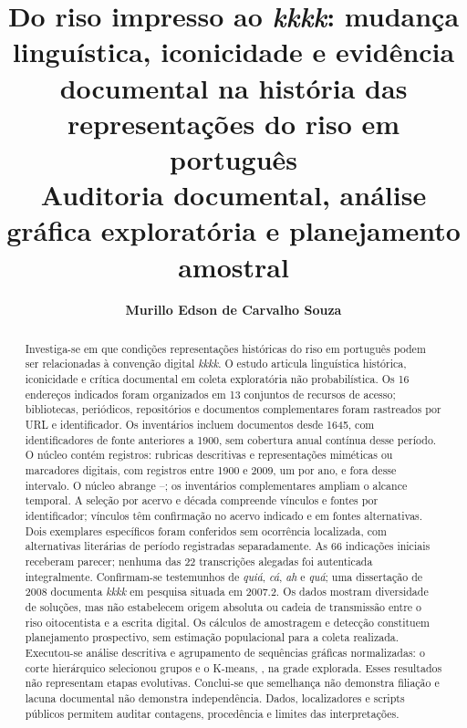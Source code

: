 \documentclass[11pt,a4paper]{article}
\author{\textbf{Murillo Edson de Carvalho Souza}}
\date{}
\title{\textbf{Do riso impresso ao \textit{kkkk}: mudança linguística, iconicidade e evidência documental na história das representações do riso em português}\\[0.6em]\large Auditoria documental, análise gráfica exploratória e planejamento amostral}
\newcommand{\forma}[1]{\textit{#1}}
\begin{document}
\maketitle
\begin{abstract}
Investiga-se em que condições representações históricas do riso em português podem ser relacionadas à convenção digital \forma{kkkk}. O estudo articula linguística histórica, iconicidade e crítica documental em coleta exploratória não probabilística. Os 16 endereços indicados foram organizados em 13 conjuntos de recursos de acesso; bibliotecas, periódicos, repositórios e documentos complementares foram rastreados por URL e identificador. Os inventários incluem documentos desde 1645, com \PreNineteenSources{} identificadores de fonte anteriores a 1900, sem cobertura anual contínua desse período. O núcleo contém \CorpusSize{} registros: \CoreRubrics{} rubricas descritivas e \CoreMimetic{} representações miméticas ou marcadores digitais, com \CoreWithin{} registros entre 1900 e 2009, um por ano, e \CoreOutside{} fora desse intervalo. O núcleo abrange \CoreMinYear{}--\CoreMaxYear{}; os inventários complementares ampliam o alcance temporal. A seleção por acervo e década compreende \ArchiveLinkCount{} vínculos e \ArchiveSourceCount{} fontes por identificador; \ArchiveDirect{} vínculos têm confirmação no acervo indicado e \ArchiveAlternative{} em fontes alternativas. Dois exemplares específicos foram conferidos sem ocorrência localizada, com alternativas literárias de período registradas separadamente. As 66 indicações iniciais receberam parecer; nenhuma das 22 transcrições alegadas foi autenticada integralmente. Confirmam-se testemunhos de \forma{quiá}, \forma{cá}, \forma{ah} e \forma{quá}; uma dissertação de 2008 documenta \forma{kkkk} em pesquisa situada em 2007.2. Os dados mostram diversidade de soluções, mas não estabelecem origem absoluta ou cadeia de transmissão entre o riso oitocentista e a escrita digital. Os cálculos de amostragem e detecção constituem planejamento prospectivo, sem estimação populacional para a coleta realizada. Executou-se análise descritiva e agrupamento de \AnalysisForms{} sequências gráficas normalizadas: o corte hierárquico selecionou \HierK{} grupos e o K-means, \KmeansK{}, na grade explorada. Esses resultados não representam etapas evolutivas. Conclui-se que semelhança não demonstra filiação e lacuna documental não demonstra independência. Dados, localizadores e scripts públicos permitem auditar contagens, procedência e limites das interpretações.
\end{abstract}
\end{document}
